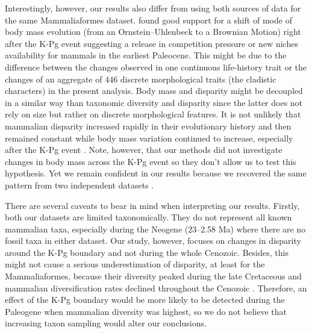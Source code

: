 \documentclass[12pt,letterpaper]{article}
\begin{document}
Interestingly, however, our results also differ from \cite{Slater2012MEE} using both sources of data for the same Mammaliaformes dataset.
\cite{Slater2012MEE} found good support for a shift of mode of body mass evolution (from an Ornstein--Uhlenbeck to a Brownian Motion) %
right after the K-Pg event suggesting a release in competition pressure or new niches availability for mammals in the earliest Paleocene.
This might be due to the difference between the changes observed in one continuous life-history trait \citep[body mass;][]{Slater2012MEE} or the changes of an aggregate of 446 discrete morphological traits (the cladistic characters) in the present analysis.
Body mass and disparity might be decoupled in a similar way than taxonomic diversity and disparity \citep[e.g.][]{slaterCetacean,ruta2013,hopkinsdecoupling2013} since the latter does not rely on size but rather on discrete morphological features.
It is not unlikely that mammalian disparity \citep[\textit{sensu ba\"{u}plan}; e.g.][]{Hughes20082013} increased rapidly in their evolutionary history and then remained constant \citep[Fig \ref{fig:Fig_Raw_results};][]{Close2015,Lee2015R759} while body mass variation continued to increase, especially after the K-Pg event \citep{Slater2012MEE}.
Note, however, that our methods did not investigate changes in body mass across the K-Pg event so they don't allow us to test this hypothesis.
Yet we remain confident in our results because we recovered the same pattern from two independent datasets \citep{Slater2012MEE,beckancient2014}.

There are several caveats to bear in mind when interpreting our results. 
Firstly, both our datasets are limited taxonomically.
They do not represent all known mammalian taxa, especially during the Neogene (23--2.58 Ma) where there are no fossil taxa in either dataset.
Our study, however, focuses on changes in disparity around the K-Pg boundary and not during the whole Cenozoic.
Besides, this might not cause a serious underestimation of disparity, at least for the Mammaliaformes, because their diversity peaked during the late Cretaceous \citep[Campanian; 72.1--83.6 Ma;][]{Newham201432} and mammalian diversification rates declined throughout the Cenozoic \citep{Raia2012}.
Therefore, an effect of the K-Pg boundary would be more likely to be detected during the Paleogene when mammalian diversity was highest, so we do not believe that increasing taxon sampling would alter our conclusions.
\end{document}
